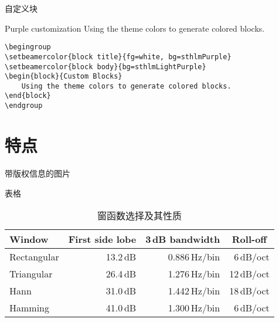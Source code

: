 \documentclass[newPxFont,sthlmFooter]{beamer}
\begin{document}

\begin{frame}[containsverbatim]{自定义块}
\begingroup
{}
\begin{block}{Purple customization}
	Using the theme colors to generate colored blocks.
\end{block}
\endgroup
\begin{verbatim}
\begingroup
\setbeamercolor{block title}{fg=white, bg=sthlmPurple}
\setbeamercolor{block body}{bg=sthlmLightPurple}
\begin{block}{Custom Blocks}
    Using the theme colors to generate colored blocks.
\end{block}
\endgroup
\end{verbatim}
\end{frame}


%
%
\section{特点}


\begin{frame}{带版权信息的图片}
	\begin{figure}
		\centering
	\end{figure}
\end{frame}


\begin{frame}{表格}
\begin{table}[]
	\caption{ 窗函数选择及其性质 }
	\begin{tabular}[]{lrrr}
		\toprule
		\textbf{Window}			& \multicolumn{1}{c}{\textbf{First side lobe}}
		                    & \multicolumn{1}{c}{\textbf{3\,dB bandwidth}}
		                    & \multicolumn{1}{c}{\textbf{Roll-off}} \\
		\midrule
		Rectangular				& 13.2\,dB	& 0.886\,Hz/bin	& 6\,dB/oct		\\[0.25em]
		Triangular				& 26.4\,dB	& 1.276\,Hz/bin	& 12\,dB/oct	\\[0.25em]
		Hann					& 31.0\,dB	& 1.442\,Hz/bin	& 18\,dB/oct	\\[0.25em]
		Hamming					& 41.0\,dB	& 1.300\,Hz/bin	& 6\,dB/oct		\\
		\bottomrule
	\end{tabular}
	\label{tab:WindowFunctions}
\end{table}
\end{frame}
\end{document}
